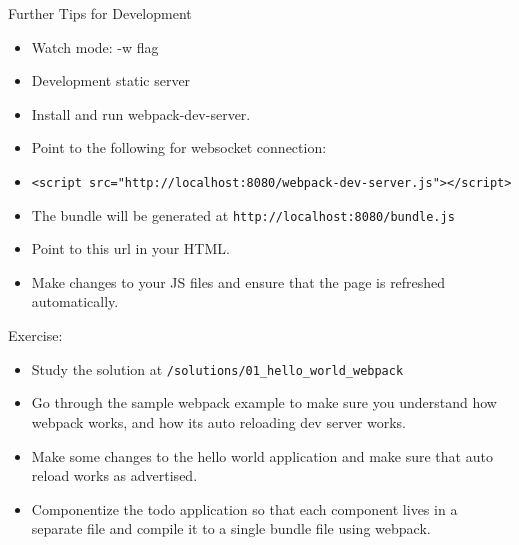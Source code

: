\documentclass[presentation]{beamer}
\begin{document}
\begin{frame}[fragile,label=sec-12]{Further Tips for Development}
 \begin{itemize}
\item Watch mode: -w flag
\item Development static server

\item Install and run webpack-dev-server.

\item Point to the following for websocket connection:

\item \verb~<script src="http://localhost:8080/webpack-dev-server.js"></script>~

\item The bundle will be generated at \texttt{http://localhost:8080/bundle.js}

\item Point to this url in your HTML.

\item Make changes to your JS files and ensure that the page is refreshed
automatically.
\end{itemize}
\end{frame}

\begin{frame}[fragile,label=sec-13]{Exercise:}
 \begin{itemize}
\item Study the solution at \texttt{/solutions/01\_hello\_world\_webpack}
\item Go through the sample webpack example to make sure you understand how
webpack works, and how its auto reloading dev server works.
\item Make some changes to the hello world application and make sure that auto
reload works as advertised.
\item Componentize the todo application so that each component lives in a separate
file and compile it to a single bundle file using webpack.
\end{itemize}
\end{frame}
\end{document}
